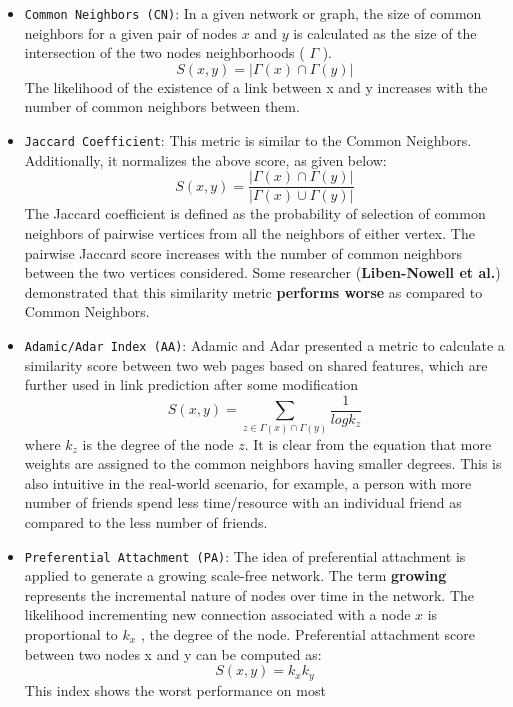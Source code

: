 \begin{itemize}
    \item \texttt{Common\ Neighbors\ (CN)}: In a given network or graph, the size
          of common neighbors for a given pair of nodes \(x\) and \(y\) is
          calculated as the size of the intersection of the two nodes
          neighborhoods ( \(\Gamma\) ). \[S(x, y) = |\Gamma(x) \cap \Gamma(y)|\]
          The likelihood of the existence of a link between x and y increases with
          the number of common neighbors between them.
    \item \texttt{Jaccard\ Coefficient}: This metric is similar to the Common
          Neighbors. Additionally, it normalizes the above score, as given below:
          \[S(x, y) = \frac{|\Gamma(x) \cap \Gamma(y)|}{|\Gamma(x) \cup \Gamma(y)|}\]
          The Jaccard coefficient is defined as the probability of selection of
          common neighbors of pairwise vertices from all the neighbors of either
          vertex. The pairwise Jaccard score increases with the number of common
          neighbors between the two vertices considered. Some researcher
          (\textbf{Liben-Nowell et al.}) demonstrated that this similarity metric
          \textbf{performs worse} as compared to Common Neighbors.
    \item \texttt{Adamic/Adar\ Index\ (AA)}: Adamic and Adar presented a metric to
          calculate a similarity score between two web pages based on shared
          features, which are further used in link prediction after some
          modification
          \[S(x, y) = \sum_{z \in \Gamma(x) \cap \Gamma(y)} \frac{1}{log k_z}\]
          where \(k_z\) is the degree of the node \(z\). It is clear from the
          equation that more weights are assigned to the common neighbors having
          smaller degrees. This is also intuitive in the real-world scenario, for
          example, a person with more number of friends spend less time/resource
          with an individual friend as compared to the less number of friends.
    \item \texttt{Preferential\ Attachment\ (PA)}: The idea of preferential
          attachment is applied to generate a growing scale-free network. The term
          \textbf{growing} represents the incremental nature of nodes over time in
          the network. The likelihood incrementing new connection associated with
          a node \(x\) is proportional to \(k_x\) , the degree of the node.
          Preferential attachment score between two nodes x and y can be computed
          as: \[S(x, y) = k_x k_y\] This index shows the worst performance on most

\end{itemize}

